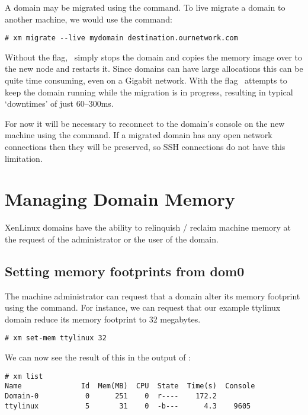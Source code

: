 A domain may be migrated using the  command.  To live
migrate a domain to another machine, we would use the command:

\begin{verbatim}
# xm migrate --live mydomain destination.ournetwork.com
\end{verbatim}

Without the  flag, \xend\ simply stops the domain and
copies the memory image over to the new node and restarts it. Since
domains can have large allocations this can be quite time consuming,
even on a Gigabit network. With the  flag \xend\ attempts
to keep the domain running while the migration is in progress,
resulting in typical `downtimes' of just 60--300ms.

For now it will be necessary to reconnect to the domain's console on
the new machine using the  command.  If a migrated
domain has any open network connections then they will be preserved,
so SSH connections do not have this limitation.


\section{Managing Domain Memory}

XenLinux domains have the ability to relinquish / reclaim machine
memory at the request of the administrator or the user of the domain.

\subsection{Setting memory footprints from dom0}

The machine administrator can request that a domain alter its memory
footprint using the  command.  For instance, we can
request that our example ttylinux domain reduce its memory footprint
to 32 megabytes.

\begin{verbatim}
# xm set-mem ttylinux 32
\end{verbatim}

We can now see the result of this in the output of :

\begin{verbatim}
# xm list
Name              Id  Mem(MB)  CPU  State  Time(s)  Console
Domain-0           0      251    0  r----    172.2        
ttylinux           5       31    0  -b---      4.3    9605
\end{verbatim}

